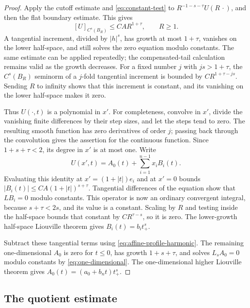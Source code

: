 \documentclass[11pt]{article}
\numberwithin{equation}{section}
\begin{document}
\begin{proof}
Apply the cutoff estimate and \eqref{eq:constant-test} to
$R^{-1-s-\tau}U(R\,\cdot)$, and then the flat boundary estimate. This gives
\begin{equation}\label{eq:liouville-Cs}
                 [U]_{C^s(B_R)}\leq CA R^{1+\tau},\qquad R\geq1.
\end{equation}
A tangential increment, divided by $|h|^s$, has growth at most
$1+\tau$, vanishes on the lower half-space, and still solves the zero
equation modulo constants. The same estimate can be applied repeatedly;
the compensated-tail calculation remains valid as the growth decreases.
For a fixed number $j$ with $js>1+\tau$, the $C^s(B_R)$ seminorm of a
$j$-fold tangential increment is bounded by $CR^{1+\tau-js}$.
Sending $R$ to infinity shows that this increment is constant, and its
vanishing on the lower half-space makes it zero.

Thus $U(\cdot,t)$ is a polynomial in $x'$. For completeness, convolve in
$x'$, divide the vanishing finite differences by their step sizes, and let
the steps tend to zero. The resulting smooth function has zero derivatives
of order $j$; passing back through the convolution gives the assertion for
the continuous function. Since $1+s+\tau<2$, its degree in $x'$ is at most
one. Write
\[
              U(x',t)=A_0(t)+\sum_{i=1}^{n-1}x_i B_i(t).
\]
Evaluating this identity at $x'=(1+|t|)e_i$ and at $x'=0$ bounds
$|B_i(t)|\leq CA(1+|t|)^{s+\tau}$. Tangential differences of the equation
show that $LB_i=0$ modulo constants. This operator is now an ordinary
convergent integral, because $s+\tau<2s$, and its value is a constant.
Scaling by $R$ and testing inside the half-space bounds that constant by
$CR^{\tau-s}$, so it is zero. The lower-growth half-space Liouville theorem
\cite[Theorem 2.7.2]{FRRO} gives $B_i(t)=b_i t_+^s$.

Subtract these tangential terms using \eqref{eq:affine-profile-harmonic}.
The remaining one-dimensional $A_0$ is zero for $t\leq0$, has growth
$1+s+\tau$, and solves $L_sA_0=0$ modulo constants by
\eqref{eq:one-dimensional}. The one-dimensional higher Liouville theorem
\cite[Proposition 3.11, $k=1$]{AR} gives
$A_0(t)=(a_0+b_n t)t_+^s$.
\end{proof}

\subsection{The quotient estimate}
\end{document}
